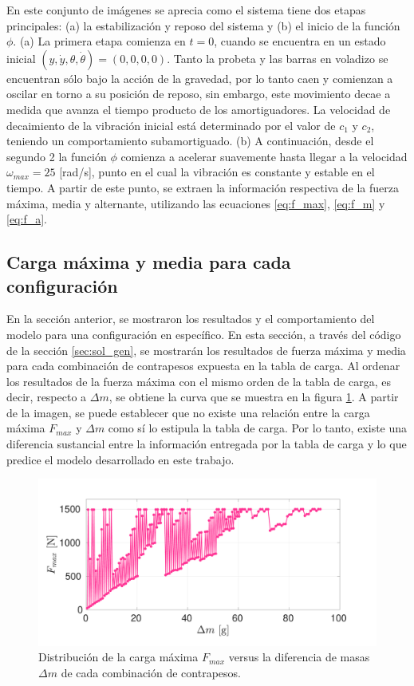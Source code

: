 En este conjunto de imágenes se aprecia como el sistema tiene dos etapas principales: (a) la estabilización y reposo del sistema y (b) el inicio de la función $\phi$. (a) La primera etapa comienza en $t=0$, cuando se encuentra en un estado inicial $(y, \dot{y}, \theta, \dot{\theta}) = (0,0,0,0)$. Tanto la probeta y las barras en voladizo se encuentran sólo bajo la acción de la gravedad, por lo tanto caen y comienzan a oscilar en torno a su posición de reposo, sin embargo, este movimiento decae a medida que avanza el tiempo producto de los amortiguadores. La velocidad de decaimiento de la vibración inicial está determinado por el valor de $c_1$ y $c_2$, teniendo un comportamiento subamortiguado. (b) A continuación, desde el segundo 2 la función $\phi$ comienza a acelerar suavemente hasta llegar a la velocidad $\omega_{max} = 25$ [rad/s], punto en el cual la vibración es constante y estable en el tiempo. A partir de este punto, se extraen la información respectiva de la fuerza máxima, media y alternante, utilizando las ecuaciones \ref{eq:f_max}, \ref{eq:f_m} y \ref{eq:f_a}. 

\subsection{Carga máxima y media para cada configuración} 

En la sección anterior, se mostraron los resultados y el comportamiento del modelo para una configuración en específico. En esta sección, a través del código de la sección \ref{sec:sol_gen}, se mostrarán los resultados de fuerza máxima y media para cada combinación de contrapesos expuesta en la tabla de carga. Al ordenar los resultados de la fuerza máxima con el mismo orden de la tabla de carga, es decir, respecto a $\Delta m$, se obtiene la curva que se muestra en la figura \ref{fig:fmax_dm}. A partir de la imagen, se puede establecer que no existe una relación entre la carga máxima $F_{max}$ y $\Delta m$ como sí lo estipula la tabla de carga. Por lo tanto, existe una diferencia sustancial entre la información entregada por la tabla de carga y lo que predice el modelo desarrollado en este trabajo. 

\begin{figure}[h]
\centering
\includegraphics[width=\linewidth, trim={0cm 1cm 2cm 2cm},clip]{Imagenes/fmax_dm.pdf}
\caption{Distribución de la carga máxima $F_{max}$ versus la diferencia de masas $\Delta m$ de cada combinación de contrapesos.}
\label{fig:fmax_dm}
\end{figure}

